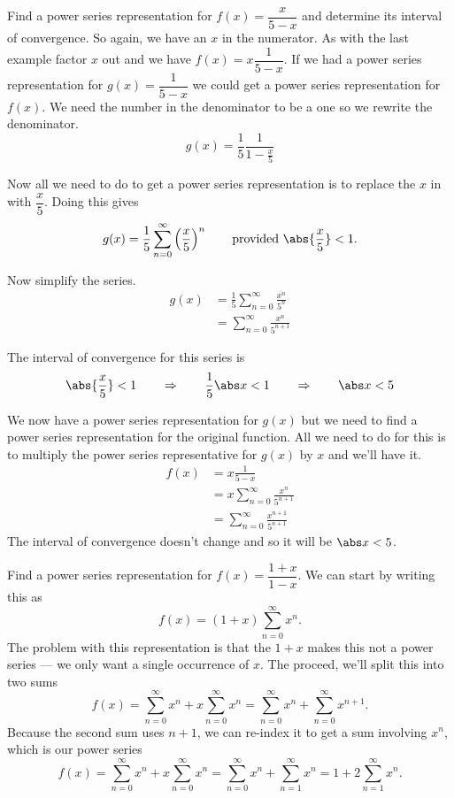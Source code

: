 \begin{example}\label{ex_power_five}
Find a power series representation for $f(x)=\dfrac x{5-x}$ and determine its interval of convergence.
\solution
So again, we have an $x$ in the numerator. As with the last example factor $x$ out and we have $f(x)=x\dfrac1{5-x}$. If we had a power series representation for $g(x)=\dfrac1{5-x}$ we could get a power series representation for $f(x)$. We need the number in the denominator to be a one so we rewrite the denominator.  
\[g(x)=\frac15\frac1{1-\frac x5}\]

Now all we need to do to get a power series representation is to replace the $x$ in  with $\dfrac x5$.  Doing this gives
\[
g(x)=\frac15\sum_{n=0}^\infty\left(\frac x5\right)^n
\qquad\text{provided } \abs{\frac x5}<1.
\]

Now simplify the series.
\begin{align*}
	g(x)
	& = \frac15\sum_{n=0}^\infty\frac{x^n}{5^n} \\
	& = \sum_{n=0}^\infty\frac{x^n}{5^{n+1}} 
\end{align*}

The interval of convergence for this series is
\[
\abs{\frac x5}<1 \qquad \Rightarrow \qquad \frac15\abs x<1
\qquad \Rightarrow \qquad\abs x<5
\]

We now have a power series representation for $g(x)$ but we need to find a power series representation for the original function.  All we need to do for this is to multiply the power series representative for $g(x)$ by $x$ and we'll have it.  
\begin{align*}
	f(x)
	&= x \frac1{5-x} \\
	&= x \sum_{n=0}^\infty\frac{x^n}{5^{n+1}}\\ 
	& = \sum_{n=0}^\infty\frac{x^{n+1}}{5^{n+1}}
\end{align*}
The interval of convergence doesn't change and so it will be $\abs x<5$.
\end{example}

\begin{example}\label{ex_power_reindex}
Find a power series representation for $f(x)=\dfrac{1+x}{1-x}$.
\solution
We can start by writing this as
\[f(x)=(1+x)\sum_{n=0}^\infty x^n.\]
The problem with this representation is that the $1+x$ makes this not a power series --- we only want a single occurrence of $x$.  The proceed, we'll split this into two sums
\[
f(x)
=\sum_{n=0}^\infty x^n+x\sum_{n=0}^\infty x^n
=\sum_{n=0}^\infty x^n+\sum_{n=0}^\infty x^{n+1}.
\]
Because the second sum uses $n+1$, we can re-index it to get a sum involving $x^n$, which is our power series
\[
f(x)
=\sum_{n=0}^\infty x^n+x\sum_{n=0}^\infty x^n
=\sum_{n=0}^\infty x^n+\sum_{n=1}^\infty x^n
=1+2\sum_{n=1}^\infty x^n.
\]
\end{example}

